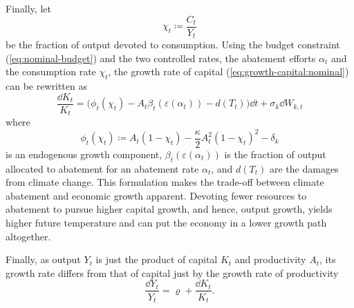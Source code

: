 \documentclass[../../main.tex]{subfiles}
\begin{document}
Finally, let \begin{equation}
    \chi_t \coloneqq \frac{C_t}{Y_t}
\end{equation} be the fraction of output devoted to consumption. Using the budget constraint (\ref{eq:nominal-budget}) and the two controlled rates, the abatement efforts $\alpha_t$ and the consumption rate $\chi_t$, the growth rate of capital (\ref{eq:growth-capital:nominal}) can be rewritten as \begin{equation}
    \frac{\dd{K_t}}{K_t} = \Big(\phi_t(\chi_t) - A_t \beta_t(\varepsilon(\alpha_t)) - d(T_t) \Big) \dd{t} + \sigma_k \dd{W}_{k, t}
\end{equation} where \begin{equation}
    \phi_t(\chi_t) \coloneqq A_t (1 - \chi_t) - \frac{\kappa}{2} A_t^2 (1 - \chi_t)^2 - \delta_k
\end{equation} is an endogenous growth component, $\beta_t(\varepsilon(\alpha_t))$ is the fraction of output allocated to abatement for an abatement rate  $\alpha_t$, and $d(T_t)$ are the damages from climate change. This formulation makes the trade-off between climate abatement and economic growth apparent. Devoting fewer resources to abatement to pursue higher capital growth, and hence, output growth, yields higher future temperature and can put the economy in a lower growth path altogether.

Finally, as output $Y_t$ is just the product of capital $K_t$ and productivity $A_t$, its growth rate differs from that of capital just by the growth rate of productivity \begin{equation}
    \frac{\dd{Y}_t}{Y_t} = \varrho + \frac{\dd{K}_t}{K_t}. 
\end{equation}
\end{document}
